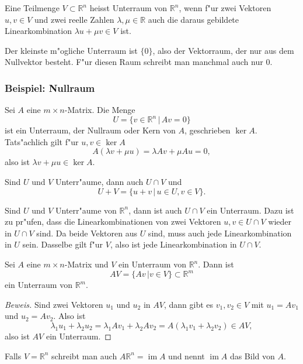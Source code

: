 \begin{definition}
Eine Teilmenge $V\subset\mathbb R^n$ heisst Unterraum von $\mathbb R^n$,
wenn f"ur zwei Vektoren
$u,v\in V$ und zwei reelle Zahlen $\lambda,\mu\in\mathbb R$
auch die daraus gebildete Linearkombination
$\lambda u+\mu v\in V$ ist.
\end{definition}

Der kleinste m"ogliche Unterraum ist $\{0\}$, also der Vektorraum, der nur aus
dem Nullvektor besteht.
F"ur diesen Raum schreibt man manchmal auch nur $0$.

\subsubsection{Beispiel: Nullraum}
Sei $A$ eine $m\times n$-Matrix.
Die Menge
\[
U=\{v\in\mathbb R^n\,|\,Av=0\}
\]
ist ein Unterraum, der Nullraum oder Kern von $A$, geschrieben
$\operatorname{ker}A$.
Tats"achlich gilt f"ur $u,v\in\operatorname{ker}A$
\[
A(\lambda v+\mu u)=\lambda Av+\mu Au=0,
\]
also ist $\lambda v+\mu u\in\operatorname{ker}A$.

\begin{satz} Sind $U$ und $V$ Unterr"aume, dann auch $U\cap V$ und
\[
U+V=\{u+v\,|\,u\in U,v\in V\}.
\]
\end{satz}

Sind $U$ und $V$ Unterr"aume von $\mathbb R^n$, dann ist auch
$U\cap V$ ein Unterraum.
Dazu ist zu pr"ufen, dass die Linearkombinationen
von zwei Vektoren $u,v\in U\cap V$ wieder in $U\cap V$ sind.
Da beide Vektoren aus $U$ sind, muss auch jede Linearkombination in $U$ sein.
Dasselbe gilt f"ur $V$, also ist jede Linearkombination in $U\cap V$.

\begin{satz}
Sei $A$ eine $m\times n$-Matrix und $V$ ein Unterraum von $\mathbb R^n$.
Dann ist
\[
AV=\{ Av\,|v\in V\}\subset\mathbb R^m
\]
ein Unterraum von $\mathbb R^m$.
\end{satz}
\begin{proof}[Beweis]
Sind zwei Vektoren $u_1$ und $u_2$ in $AV$, dann gibt es $v_1,v_2\in V$ mit
$u_1=Av_1$ und $u_2=Av_2$.
Also ist
\[
\lambda_1u_1+\lambda_2u_2
=
\lambda_1Av_1+\lambda_2Av_2
=
A(\lambda_1v_1+\lambda_2v_2)\in AV,
\]
also ist $AV$ ein Unterraum.
\end{proof}
Falls $V=\mathbb R^n$ schreibt man auch $A\mathbb R^n=\operatorname{im}A$
und nennt $\operatorname{im}A$ das Bild von $A$.


